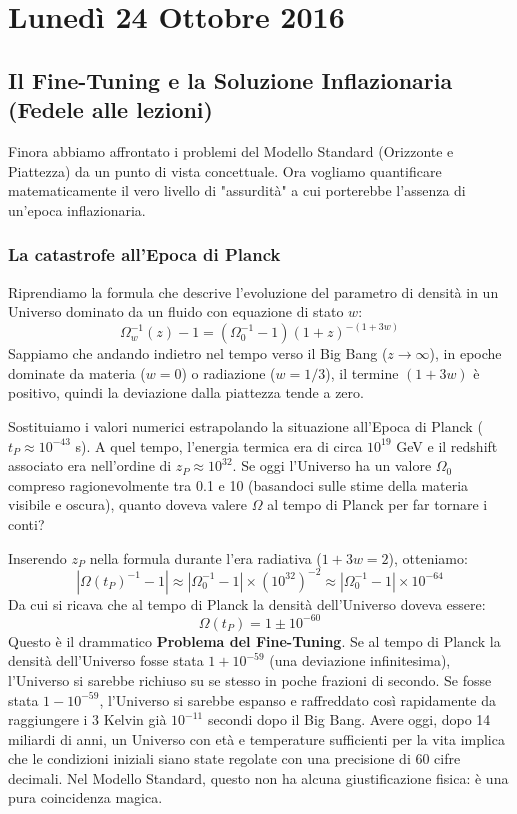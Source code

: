 \documentclass[11pt,a4paper]{report}
\begin{document}
\chapter{Lunedì 24 Ottobre 2016}

\section{Il Fine-Tuning e la Soluzione Inflazionaria (Fedele alle lezioni)}

Finora abbiamo affrontato i problemi del Modello Standard (Orizzonte e Piattezza) da un punto di vista concettuale. Ora vogliamo quantificare matematicamente il vero livello di "assurdità" a cui porterebbe l'assenza di un'epoca inflazionaria.

\subsection{La catastrofe all'Epoca di Planck}
Riprendiamo la formula che descrive l'evoluzione del parametro di densità in un Universo dominato da un fluido con equazione di stato $w$:
\begin{equation}
\Omega_w^{-1}(z) - 1 = (\Omega_{0}^{-1} - 1)(1+z)^{-(1+3w)}
\end{equation}
Sappiamo che andando indietro nel tempo verso il Big Bang ($z \to \infty$), in epoche dominate da materia ($w=0$) o radiazione ($w=1/3$), il termine $(1+3w)$ è positivo, quindi la deviazione dalla piattezza tende a zero. 

Sostituiamo i valori numerici estrapolando la situazione all'Epoca di Planck ($t_P \approx 10^{-43}$ s). A quel tempo, l'energia termica era di circa $10^{19}$ GeV e il redshift associato era nell'ordine di $z_P \approx 10^{32}$. 
Se oggi l'Universo ha un valore $\Omega_0$ compreso ragionevolmente tra 0.1 e 10 (basandoci sulle stime della materia visibile e oscura), quanto doveva valere $\Omega$ al tempo di Planck per far tornare i conti?

Inserendo $z_P$ nella formula durante l'era radiativa ($1+3w = 2$), otteniamo:
\begin{equation}
|\Omega(t_P)^{-1} - 1| \approx |\Omega_0^{-1} - 1| \times (10^{32})^{-2} \approx |\Omega_0^{-1} - 1| \times 10^{-64}
\end{equation}
Da cui si ricava che al tempo di Planck la densità dell'Universo doveva essere:
\begin{equation}
\Omega(t_P) = 1 \pm 10^{-60}
\end{equation}
Questo è il drammatico \textbf{Problema del Fine-Tuning}. Se al tempo di Planck la densità dell'Universo fosse stata $1 + 10^{-59}$ (una deviazione infinitesima), l'Universo si sarebbe richiuso su se stesso in poche frazioni di secondo. Se fosse stata $1 - 10^{-59}$, l'Universo si sarebbe espanso e raffreddato così rapidamente da raggiungere i $3$ Kelvin già $10^{-11}$ secondi dopo il Big Bang. 
Avere oggi, dopo 14 miliardi di anni, un Universo con età e temperature sufficienti per la vita implica che le condizioni iniziali siano state regolate con una precisione di 60 cifre decimali. Nel Modello Standard, questo non ha alcuna giustificazione fisica: è una pura coincidenza magica.
\end{document}
